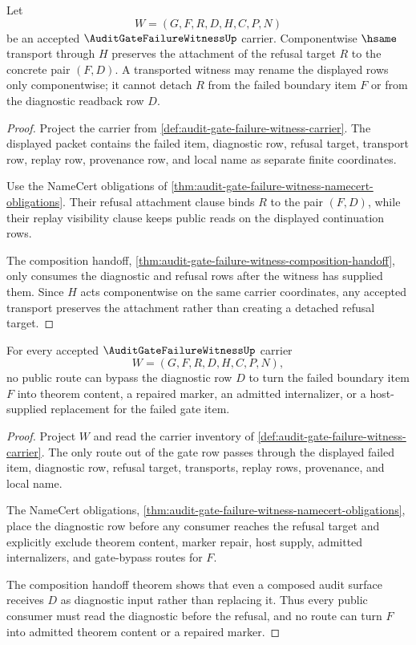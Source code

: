 \begin{theorem}
\label{thm:audit-gate-failure-witness-refusal-attachment-stability}
Let
$$
W=(G,F,R,D,H,C,P,N)
$$
be an accepted $\AuditGateFailureWitnessUp$ carrier. Componentwise $\hsame$
transport through $H$ preserves the attachment of the refusal target $R$ to the
concrete pair $(F,D)$. A transported witness may rename the displayed rows only
componentwise; it cannot detach $R$ from the failed boundary item $F$ or from
the diagnostic readback row $D$.
\end{theorem}
\begin{proof}
Project the carrier from \autoref{def:audit-gate-failure-witness-carrier}. The
displayed packet contains the failed item, diagnostic row, refusal target,
transport row, replay row, provenance row, and local name as separate finite
coordinates.

Use the NameCert obligations of
\autoref{thm:audit-gate-failure-witness-namecert-obligations}. Their refusal
attachment clause binds $R$ to the pair $(F,D)$, while their replay visibility
clause keeps public reads on the displayed continuation rows.

The composition handoff,
\autoref{thm:audit-gate-failure-witness-composition-handoff}, only consumes
the diagnostic and refusal rows after the witness has supplied them. Since $H$
acts componentwise on the same carrier coordinates, any accepted transport
preserves the attachment rather than creating a detached refusal target.
\end{proof}

\begin{theorem}
\label{thm:audit-gate-failure-witness-diagnostic-nonescape}
For every accepted $\AuditGateFailureWitnessUp$ carrier
$$
W=(G,F,R,D,H,C,P,N),
$$
no public route can bypass the diagnostic row $D$ to turn the failed boundary
item $F$ into theorem content, a repaired marker, an admitted internalizer, or
a host-supplied replacement for the failed gate item.
\end{theorem}
\begin{proof}
Project $W$ and read the carrier inventory of
\autoref{def:audit-gate-failure-witness-carrier}. The only route out of the
gate row passes through the displayed failed item, diagnostic row, refusal
target, transports, replay rows, provenance, and local name.

The NameCert obligations,
\autoref{thm:audit-gate-failure-witness-namecert-obligations}, place the
diagnostic row before any consumer reaches the refusal target and explicitly
exclude theorem content, marker repair, host supply, admitted internalizers,
and gate-bypass routes for $F$.

The composition handoff theorem shows that even a composed audit surface
receives $D$ as diagnostic input rather than replacing it. Thus every public
consumer must read the diagnostic before the refusal, and no route can turn
$F$ into admitted theorem content or a repaired marker.
\end{proof}

